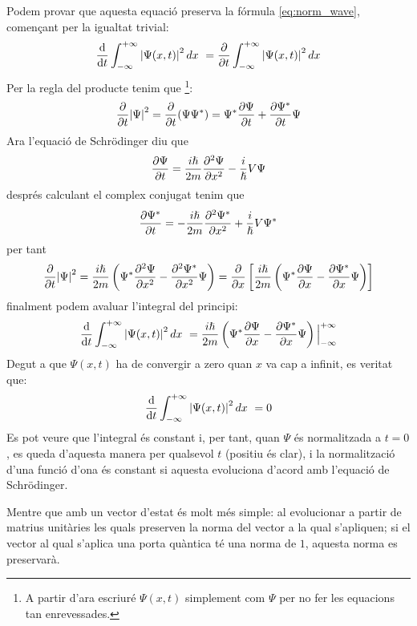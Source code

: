Podem provar que aquesta equació preserva la fórmula \ref{eq:norm_wave}, començant per la igualtat trivial:
$$
\dv{t} \int_{-\infty}^{+\infty}\abs{\Psi(x,t)}^2\, dx\ = \pdv{t} \int_{-\infty}^{+\infty}\abs{\Psi(x,t)}^2\, dx
$$
Per la regla del producte tenim que \footnote{A partir d'ara escriuré  $\Psi(x,t)$ simplement com $\Psi$ per no fer les equacions tan enrevessades.}:
$$
\pdv{t}\abs{\Psi}^2 = \pdv{t}(\Psi\Psi^*) = \Psi^*\pdv{\Psi}{t} + \pdv{\Psi^*}{t}\Psi
$$
Ara l'equació de Schrödinger diu que
$$
\pdv{\Psi}{t} = \frac{i\hslash}{2m}\pdv[2]{\Psi}{x} -  \frac{i}{\hslash}V\Psi
$$
després calculant el complex conjugat tenim que 
$$
\pdv{\Psi^*}{t} = - \frac{i\hslash}{2m}\pdv[2]{\Psi^*}{x} + \frac{i}{\hslash}V\Psi^*
$$
per tant
$$
\pdv{t}\abs{\Psi}^2 = \frac{i\hslash}{2m} \left( \Psi^*\pdv[2]{\Psi}{x} - \pdv[2]{\Psi^*}{x}\Psi \right) = \pdv{x} \left[ \frac{i\hslash}{2m} \left(\Psi^*\pdv{\Psi}{x} - \pdv{\Psi^*}{x}\Psi\right)\right]
$$
finalment podem avaluar l'integral del principi:
$$
\dv{t} \int_{-\infty}^{+\infty}\abs{\Psi(x,t)}^2\, dx\ = \frac{i\hslash}{2m} \left( \Psi^*\pdv{\Psi}{x} - \pdv{\Psi^*}{x}\Psi \right) \Big|_{-\infty}^{+\infty}
$$
Degut a que $\Psi(x,t)$ ha de convergir a zero quan $x$ va cap a infinit, es veritat que:
$$
\dv{t} \int_{-\infty}^{+\infty}\abs{\Psi(x,t)}^2\, dx\ = 0
$$
Es pot veure que l'integral és constant i, per tant, quan $\Psi$ és normalitzada a $t=0$, es queda d'aquesta manera per qualsevol $t$ (positiu és clar), i la normalització d'una funció d'ona és constant si aquesta evoluciona d'acord amb l'equació de Schrödinger.

Mentre que amb un vector d'estat és molt més simple: al evolucionar a partir de matrius unitàries les quals preserven la norma del vector a la qual s'apliquen; si el vector al qual s'aplica una porta quàntica té una norma de $1$, aquesta norma es preservarà.

